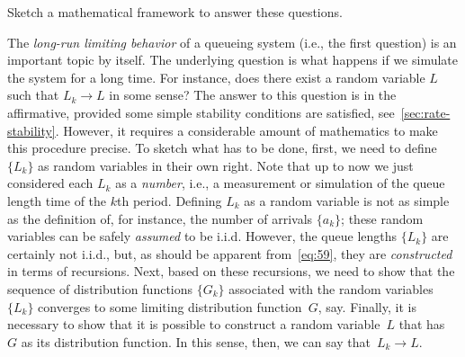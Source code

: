 \begin{extra}
Sketch a mathematical framework to answer these questions. 

\begin{solution}
 
The \emph{long-run limiting behavior} of a queueing system (i.e., the first question) is an important topic by itself.
The underlying question is what happens if we simulate the system for a long time.
For instance, does there exist a random variable $L$ such that $L_k\to L$ in some sense?
The answer to this question is in the affirmative, provided some simple stability conditions are satisfied, see~\cref{sec:rate-stability}.
However, it requires a considerable amount of mathematics to make this procedure precise.
To sketch what has to be done, first, we need to define $\{L_k\}$ as random variables in their own right.
Note that up to now we just considered each $L_k$ as a \emph{number}, i.e., a measurement or simulation of the queue length time of the $k$th period.
Defining $L_k$ as a random variable is not as simple as the definition of, for instance, the number of arrivals $\{a_k\}$; these random variables can be safely \emph{assumed} to be i.i.d.
However, the queue lengths $\{L_k\}$ are certainly not i.i.d., but, as should be apparent from~\cref{eq:59}, they are \emph{constructed} in terms of recursions.
Next, based on these recursions, we need to show that the sequence of distribution functions $\{G_k\}$ associated with the random variables $\{L_k\}$ converges to some limiting distribution function~$G$, say.
Finally, it is necessary to show that it is possible to construct a random variable~$L$ that has~$G$ as its distribution function.
In this sense, then, we can say that~$L_k \to L$.
\end{solution}

\end{extra}


